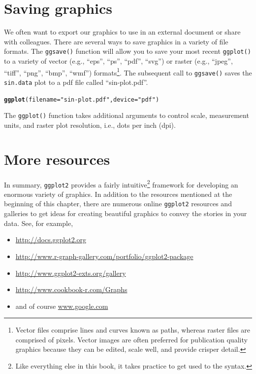 \documentclass[12pt,oneside]{book}\usepackage[]{graphicx}\usepackage[]{color}
\makeatletter
\newcommand{\hlstr}[1]{\textcolor[rgb]{0.192,0.494,0.8}{#1}}%
\newcommand{\hlstd}[1]{\textcolor[rgb]{0.345,0.345,0.345}{#1}}%
\newcommand{\hlkwc}[1]{\textcolor[rgb]{0.333,0.667,0.333}{#1}}%
\newcommand{\hlkwd}[1]{\textcolor[rgb]{0.737,0.353,0.396}{\textbf{#1}}}%
\newenvironment{kframe}{%
 \def\at@end@of@kframe{}%
 \ifinner\ifhmode%
  \def\at@end@of@kframe{\end{minipage}}%
  \begin{minipage}{\columnwidth}%
 \fi\fi%
 \def\FrameCommand##1{\hskip\@totalleftmargin \hskip-\fboxsep
 \colorbox{shadecolor}{##1}\hskip-\fboxsep
     \hskip-\linewidth \hskip-\@totalleftmargin \hskip\columnwidth}%
 \MakeFramed {\advance\hsize-\width
   \@totalleftmargin\z@ \linewidth\hsize
   \@setminipage}}%
 {\par\unskip\endMakeFramed%
 \at@end@of@kframe}
\newenvironment{knitrout}{}{} %
\makeatother
\begin{document}
\section{Saving graphics}
We often want to export our graphics to use in an external document or share with colleagues. There are several ways to save graphics in a variety of file formats. The \verb+ggsave()+ function will allow you to save your most recent \verb+ggplot()+ to a variety of vector (e.g., ``eps'', ``ps'', ``pdf'', ``svg'') or raster (e.g., ``jpeg'', ``tiff'', ``png'', ``bmp'', ``wmf'') formats\footnote{Vector files comprise lines and curves known as paths, whereas raster files are comprised of pixels. Vector images are often preferred for publication quality graphics because they can be edited, scale well, and provide crisper detail.}. The subsequent call to \verb+ggsave()+ saves the \verb+sin.data+ plot to a pdf file called ``sin-plot.pdf''.
\begin{knitrout}
\color{fgcolor}\begin{kframe}
\begin{alltt}
\hlkwd{ggplot}\hlstd{(}\hlkwc{filename} \hlstd{=} \hlstr{"sin-plot.pdf"}\hlstd{,} \hlkwc{device}\hlstd{=}\hlstr{"pdf"}\hlstd{)}
\end{alltt}
\end{kframe}
\end{knitrout}
The \verb+ggplot()+ function takes additional arguments to control scale, measurement units, and raster plot resolution, i.e., dots per inch (dpi). 


\section{More resources}
In summary, \verb+ggplot2+ provides a fairly intuitive\footnote{Like everything else in this book, it takes practice to get used to the syntax.} framework for developing an enormous variety of graphics. In addition to the resources mentioned at the beginning of this chapter, there are numerous online \verb+ggplot2+ resources and galleries to get ideas for creating beautiful graphics to convey the stories in your data. See, for example, 
\begin{itemize}
\item \url{http://docs.ggplot2.org}
\item \url{http://www.r-graph-gallery.com/portfolio/ggplot2-package}
\item \url{http://www.ggplot2-exts.org/gallery}
\item \url{http://www.cookbook-r.com/Graphs}
\item and of course \url{www.google.com}
\end{itemize}
\end{document}
